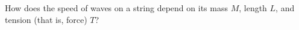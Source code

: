 How does the speed of waves on a string depend on its mass $M$, length $L$, and tension (that is, force) $T$?